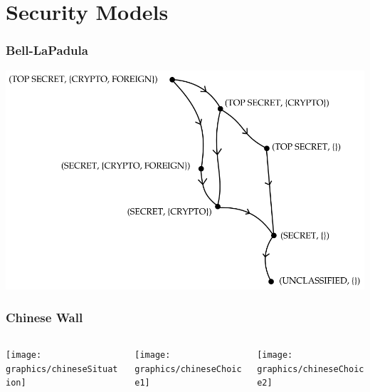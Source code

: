 
\section{Security Models}

\begin{frame}
  \frametitle{Bell-LaPadula}
  \centering

  \includegraphics[width=\textwidth]{graphics/blp_lattice}
\end{frame}

\begin{frame}
  \frametitle{Chinese Wall}

  \begin{columns}
    \begin{column}{.33\textwidth}
      \texttt{[image: graphics/chineseSituation]}
    \end{column}
    \begin{column}{.33\textwidth}
      \texttt{[image: graphics/chineseChoice1]}
    \end{column}
    \begin{column}{.33\textwidth}
      \texttt{[image: graphics/chineseChoice2]}
    \end{column}
  \end{columns}
\end{frame}

